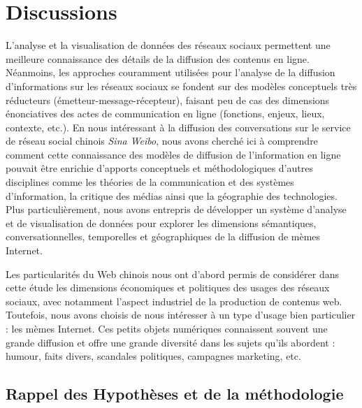 \section[Discussions]{Discussions}
 

 
L{\textquoteright}analyse et la visualisation de donn\'ees des r\'eseaux  sociaux permettent une meilleure connaissance des d\'etails de la  diffusion des contenus en ligne. N\'eanmoins, les approches couramment  utilis\'ees pour l{\textquoteright}analyse de la diffusion  d{\textquoteright}informations sur les r\'eseaux sociaux se fondent sur  des mod\`eles conceptuels tr\`es r\'educteurs  (\'emetteur-message-r\'ecepteur), faisant peu de cas des dimensions  \'enonciatives des actes de communication en ligne (fonctions, enjeux,  lieux, contexte, etc.). En nous int\'eressant \`a la diffusion des  conversations sur le service de r\'eseau social chinois \textit{Sina  Weibo}, nous avons cherch\'e ici \`a comprendre comment cette  connaissance des mod\`eles de diffusion de  l{\textquoteright}information en ligne pouvait \^etre enrichie  d{\textquoteright}apports conceptuels et m\'ethodologiques  d{\textquoteright}autres disciplines comme les th\'eories de la  communication et des syst\`emes d{\textquoteright}information, la  critique des m\'edias ainsi que la g\'eographie des technologies. Plus  particuli\`erement, nous avons entrepris de d\'evelopper un syst\`eme  d{\textquoteright}analyse et de visualisation de donn\'ees pour  explorer les dimensions s\'emantiques, conversationnelles, temporelles  et g\'eographiques de la diffusion de m\`emes Internet.   
 
 
Les particularit\'es du Web chinois nous ont d{\textquoteright}abord  permis de consid\'erer dans cette \'etude les dimensions \'economiques  et politiques des usages des r\'eseaux sociaux, avec notamment  l{\textquoteright}aspect industriel de la production de contenus web.  Toutefois, nous avons choisis de nous int\'eresser \`a un type  d{\textquoteright}usage bien particulier : les m\`emes Internet. Ces  petits objets num\'eriques connaissent souvent une grande diffusion et  offre une grande diversit\'e dans les sujets qu{\textquoteright}ils  abordent : humour, faits divers, scandales politiques, campagnes  marketing, etc.    


\subsection{Rappel des Hypoth\`eses et de la méthodologie}

